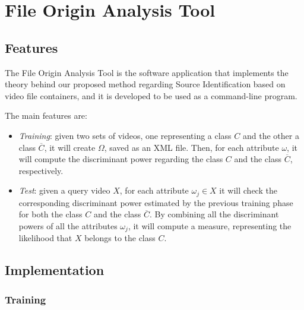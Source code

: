 \section{File Origin Analysis Tool}

\subsection{Features}

The File Origin Analysis Tool is the software application that implements the theory behind our proposed method regarding Source Identification based on video file containers, and it is developed to be used as a command-line program.

The main features are:
\begin{itemize}

\item \emph{Training}: given two sets of videos, one representing a class $C$ and the other a class $\overline{C}$, it will create $\Omega$, saved as an XML file. Then, for each attribute $\omega$, it will compute the discriminant power regarding the class $C$ and the class $\overline{C}$, respectively.

\item \emph{Test}: given a query video $X$, for each attribute $\omega_{j} \in X$ it will check the corresponding discriminant power estimated by the previous training phase for both the class $C$ and the class $\overline{C}$. By combining all the discriminant powers of all the attributes $\omega_{j}$, it will compute a measure, representing the likelihood that $X$ belongs to the class $C$.

\end{itemize}

\subsection{Implementation}

\subsubsection*{Training}

